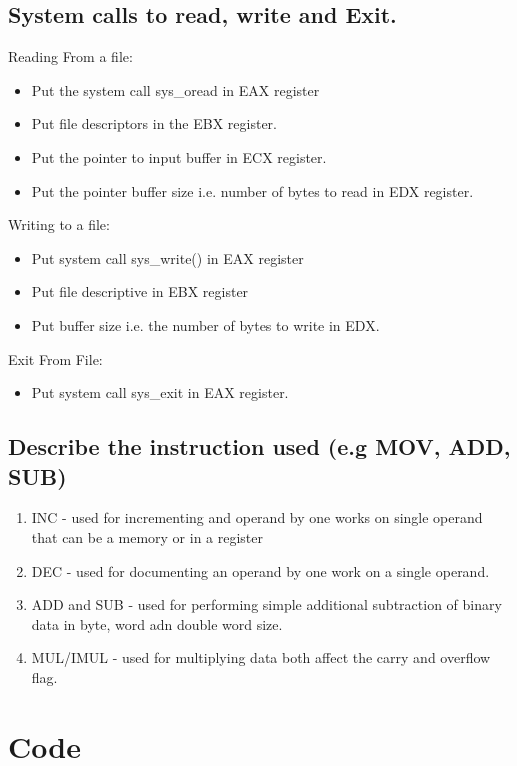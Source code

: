 \documentclass[11pt]{article}
\begin{document}
\subsection{\textbf{System calls to read, write and Exit.}}

Reading From a file:
\begin{itemize}
    \item Put the system call sys\_oread in EAX register 
    \item Put file descriptors in the EBX register.
    \item Put the pointer to input buffer in ECX register.
    \item Put the pointer buffer size i.e. number of bytes to read in EDX register.
\end{itemize}

Writing to a file:
\begin{itemize}
    \item Put system call sys\_write() in EAX register
    \item Put file descriptive in EBX register 
    \item Put buffer size i.e. the number of bytes to write in EDX.
\end{itemize}

Exit From File:
\begin{itemize}
    \item Put system call sys\_exit in EAX register.
\end{itemize}

\subsection{\textbf{Describe the instruction used (e.g MOV, ADD, SUB)}}
\begin{enumerate}
    \item INC - used for incrementing and operand by one works on single operand that can be a memory or in a register
    \item DEC - used for documenting an operand by one work on a single operand.
    \item ADD and SUB - used for performing simple additional subtraction of binary data in byte, word adn double word size.
    \item MUL/IMUL - used for multiplying data both affect the carry and overflow flag. 
\end{enumerate}


\section{Code}

\end{document}
